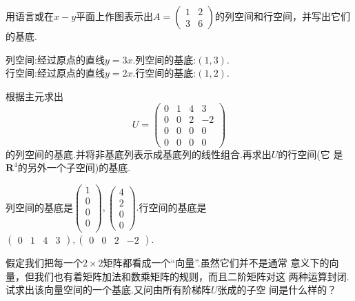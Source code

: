 ﻿\documentclass{book} \usepackage{exsheets} \usepackage{xeCJK}
\begin{document}
\begin{question}
  用语言或在$x-y$平面上作图表示出$A=
  \begin{pmatrix}
    1&2\\
    3&6
  \end{pmatrix}
  $的列空间和行空间，并写出它们的基底.
\end{question}
\begin{solution}
  列空间:经过原点的直线$y=3x$.列空间的基底:$(1,3)$.\\
  行空间:经过原点的直线$y=2x$.行空间的基底:$(1,2)$.
\end{solution}
\begin{question}
  根据主元求出
$$
U=
\begin{pmatrix}
  0&1&4&3\\
  0&0&2&-2\\
  0&0&0&0\\
  0&0&0&0
\end{pmatrix}
$$
的列空间的基底.并将非基底列表示成基底列的线性组合.再求出$U$的行空间(它
是$\mathbf{R}^4$的另外一个子空间)的基底.
\end{question}
\begin{solution}
  列空间的基底是$
  \begin{pmatrix}
    1\\
    0\\
    0\\
    0\\
  \end{pmatrix},
  \begin{pmatrix}
    4\\
    2\\
    0\\
    0
  \end{pmatrix}.  $行空间的基底是$
  \begin{pmatrix}
    0&1&4&3
  \end{pmatrix},
  \begin{pmatrix}
    0&0&2&-2
  \end{pmatrix}.$
\end{solution}
\begin{question}
  假定我们把每一个$2\times 2$矩阵都看成一个“向量”.虽然它们并不是通常
  意义下的向量，但我们也有着矩阵加法和数乘矩阵的规则，而且二阶矩阵对这
  两种运算封闭.试求出该向量空间的一个基底.又问由所有阶梯阵$U$张成的子空
  间是什么样的？
\end{question}
\end{document}
